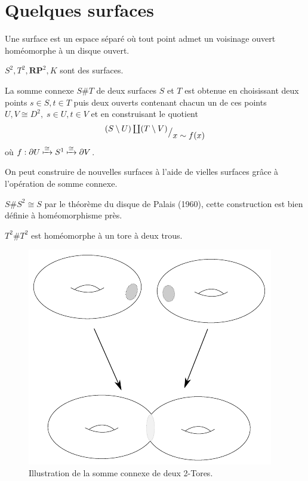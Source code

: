 \documentclass[main.tex]{subfiles}
\begin{document}
	\section{Quelques surfaces}
	\begin{definition}[Surface]
		Une surface est un espace séparé où tout point admet un voisinage ouvert homéomorphe à un disque ouvert.	
	\end{definition}
	\begin{example}
		$S^2, T^2, \mathbf{RP}^2, K$ sont des surfaces. 
	\end{example}
	\begin{definition}
		La somme connexe $S\#T$ de deux surfaces $S$ et $T$ est obtenue en choisissant deux points $s \in S, t \in T$ puis deux ouverts contenant chacun un de ces points $U, V \cong D^2, \; s \in U, t \in V$ et en construisant le quotient \[
			{^{\textstyle (S\setminus U)\coprod (T \setminus V)}\big/_{\textstyle x\sim f(x)}}
		\] 
			où $f : \partial U \xmapsto{\cong} S^1 \xmapsto{\cong} \partial V$.
	\end{definition}
	On peut construire de nouvelles surfaces à l'aide de vielles surfaces grâce à l'opération de somme connexe.
	\begin{example}
		$S\#S^2 \cong S$ par le théorème du disque de Palais (1960), cette construction est bien définie à homéomorphisme près.
	\end{example}
	\begin{example}
		$T^2\#T^2$ est homéomorphe à un tore à deux trous.
	\end{example}
	\begin{figure}[ht]
			\centering
			\includegraphics{connectedsum.pdf}
			\caption{Illustration de la somme connexe de deux 2-Tores.}
	\end{figure}
\end{document}

